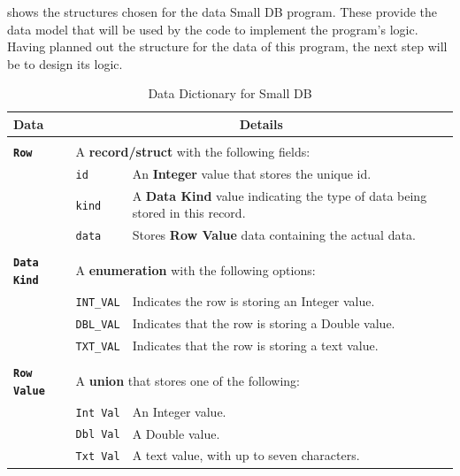  shows the structures chosen for the data Small DB program. These provide the data model that will be used by the code to implement the program's logic. Having planned out the structure for the data of this program, the next step will be to design its logic.

\begin{table}[htbp]
  \centering
  \begin{tabular}{|l|l|l|}
    \hline
    \textbf{Data} & \multicolumn{2}{c|}{\textbf{Details}}  \\ 
    \hline
    \multicolumn{3}{c}{} \\
    \hline
    \textbf{\texttt{Row}} & \multicolumn{2}{l|}{A \textbf{record/struct} with the following fields:}  \\
    \hline
    & \texttt{id} & An \textbf{Integer} value that stores the unique id. \\
    \hline
    & \texttt{kind} & A \textbf{Data Kind} value indicating the type of data being stored in this record. \\
    \hline
    & \texttt{data} & Stores \textbf{Row Value} data containing the actual data. \\ 
    \hline
    \multicolumn{3}{c}{} \\
    \hline
    \textbf{\texttt{Data Kind}} & \multicolumn{2}{l|}{A \textbf{enumeration} with the following options:}\\
    \hline
    & \texttt{INT\_VAL} & Indicates the row is storing an Integer value. \\
    \hline
    & \texttt{DBL\_VAL} & Indicates that the row is storing a Double value. \\
    \hline
    &  \texttt{TXT\_VAL} & Indicates that the row is storing a text value. \\
    \hline
    \multicolumn{3}{c}{} \\
    \hline
    \textbf{\texttt{Row Value}} & \multicolumn{2}{l|}{A \textbf{union} that stores one of the following:}\\
    \hline
    & \texttt{Int Val} & An Integer value. \\
    \hline 
    & \texttt{Dbl Val} & A Double value. \\
    \hline
    & \texttt{Txt Val} & A text value, with up to seven characters. \\
    \hline
  \end{tabular}
  \caption{Data Dictionary for Small DB}
  \label{tbl:dd-small-db}
\end{table}


